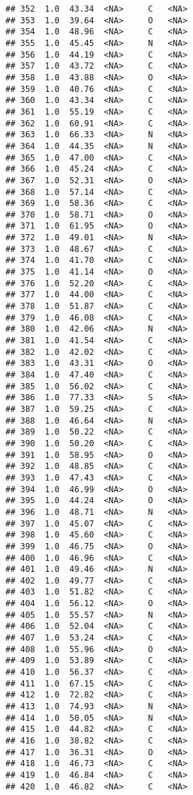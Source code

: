 \documentclass[
]{article}
\begin{document}
\begin{verbatim}
## 352  1.0  43.34  <NA>     C   <NA>
## 353  1.0  39.64  <NA>     O   <NA>
## 354  1.0  48.96  <NA>     C   <NA>
## 355  1.0  45.45  <NA>     N   <NA>
## 356  1.0  44.19  <NA>     C   <NA>
## 357  1.0  43.72  <NA>     C   <NA>
## 358  1.0  43.88  <NA>     O   <NA>
## 359  1.0  40.76  <NA>     C   <NA>
## 360  1.0  43.34  <NA>     C   <NA>
## 361  1.0  55.19  <NA>     C   <NA>
## 362  1.0  60.91  <NA>     C   <NA>
## 363  1.0  66.33  <NA>     N   <NA>
## 364  1.0  44.35  <NA>     N   <NA>
## 365  1.0  47.00  <NA>     C   <NA>
## 366  1.0  45.24  <NA>     C   <NA>
## 367  1.0  52.31  <NA>     O   <NA>
## 368  1.0  57.14  <NA>     C   <NA>
## 369  1.0  58.36  <NA>     C   <NA>
## 370  1.0  58.71  <NA>     O   <NA>
## 371  1.0  61.95  <NA>     O   <NA>
## 372  1.0  49.01  <NA>     N   <NA>
## 373  1.0  48.67  <NA>     C   <NA>
## 374  1.0  41.70  <NA>     C   <NA>
## 375  1.0  41.14  <NA>     O   <NA>
## 376  1.0  52.20  <NA>     C   <NA>
## 377  1.0  44.00  <NA>     C   <NA>
## 378  1.0  51.87  <NA>     C   <NA>
## 379  1.0  46.08  <NA>     C   <NA>
## 380  1.0  42.06  <NA>     N   <NA>
## 381  1.0  41.54  <NA>     C   <NA>
## 382  1.0  42.02  <NA>     C   <NA>
## 383  1.0  43.31  <NA>     O   <NA>
## 384  1.0  47.40  <NA>     C   <NA>
## 385  1.0  56.02  <NA>     C   <NA>
## 386  1.0  77.33  <NA>     S   <NA>
## 387  1.0  59.25  <NA>     C   <NA>
## 388  1.0  46.64  <NA>     N   <NA>
## 389  1.0  50.22  <NA>     C   <NA>
## 390  1.0  50.20  <NA>     C   <NA>
## 391  1.0  58.95  <NA>     O   <NA>
## 392  1.0  48.85  <NA>     C   <NA>
## 393  1.0  47.43  <NA>     C   <NA>
## 394  1.0  46.99  <NA>     O   <NA>
## 395  1.0  44.24  <NA>     O   <NA>
## 396  1.0  48.71  <NA>     N   <NA>
## 397  1.0  45.07  <NA>     C   <NA>
## 398  1.0  45.60  <NA>     C   <NA>
## 399  1.0  46.75  <NA>     O   <NA>
## 400  1.0  46.96  <NA>     C   <NA>
## 401  1.0  49.46  <NA>     N   <NA>
## 402  1.0  49.77  <NA>     C   <NA>
## 403  1.0  51.82  <NA>     C   <NA>
## 404  1.0  56.12  <NA>     O   <NA>
## 405  1.0  55.57  <NA>     N   <NA>
## 406  1.0  52.04  <NA>     C   <NA>
## 407  1.0  53.24  <NA>     C   <NA>
## 408  1.0  55.96  <NA>     O   <NA>
## 409  1.0  53.89  <NA>     C   <NA>
## 410  1.0  56.37  <NA>     C   <NA>
## 411  1.0  67.15  <NA>     C   <NA>
## 412  1.0  72.82  <NA>     C   <NA>
## 413  1.0  74.93  <NA>     N   <NA>
## 414  1.0  50.05  <NA>     N   <NA>
## 415  1.0  44.82  <NA>     C   <NA>
## 416  1.0  38.82  <NA>     C   <NA>
## 417  1.0  36.31  <NA>     O   <NA>
## 418  1.0  46.73  <NA>     C   <NA>
## 419  1.0  46.84  <NA>     C   <NA>
## 420  1.0  46.82  <NA>     C   <NA>

\end{verbatim}
\end{document}

